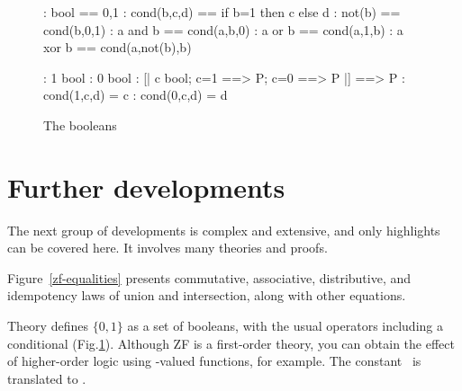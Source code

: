 \begin{figure}
%
\begin{alltt*}\isastyleminor
{}:      bool == {\ttlbrace}0,1{\ttrbrace}
:      cond(b,c,d) == if b=1 then c else d
:       not(b)  == cond(b,0,1)
:       a and b == cond(a,b,0)
:        a or b  == cond(a,1,b)
:       a xor b == cond(a,not(b),b)

:       1 \isasymin bool
:       0 \isasymin bool
:         [| c \isasymin bool;  c=1 ==> P;  c=0 ==> P |] ==> P
:        cond(1,c,d) = c
:        cond(0,c,d) = d
\end{alltt*}
\caption{The booleans} \label{zf-bool}
\end{figure}


\section{Further developments}
The next group of developments is complex and extensive, and only
highlights can be covered here.  It involves many theories and proofs. 

Figure~\ref{zf-equalities} presents commutative, associative, distributive,
and idempotency laws of union and intersection, along with other equations.

Theory  defines $\{0,1\}$ as a set of booleans, with the usual
operators including a conditional (Fig.\ts\ref{zf-bool}).  Although ZF is a
first-order theory, you can obtain the effect of higher-order logic using
-valued functions, for example.  The constant~ is
translated to .

